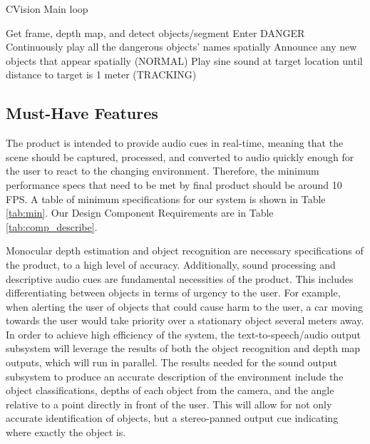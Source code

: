 \documentclass[12pt,a4paper]{article}
\begin{document}
  \begin{algorithm}
    \caption{CVision Main loop}
    \label{alg:grandloop}  %
    \begin{algorithmic}[1]
            \State Get frame, depth map, and detect objects/segment
                \State Enter DANGER
            \EndIf
                \State Continuously play all the dangerous objects' names spatially
            \Else
                \State Announce any new objects that appear spatially (NORMAL)
            \EndIf
                \State Play sine sound at target location until distance to target is 1 meter (TRACKING)
            \EndIf
        \EndWhile
        \end{algorithmic}
        \end{algorithm}



        
        \subsection{Must-Have Features}
        The product is intended to provide audio cues in real-time, meaning that the scene should be captured, processed, and converted to audio quickly enough for the user to react to the changing environment.
        Therefore, the minimum performance specs that need to be met by final product should be around 10 FPS.
        A table of minimum specifications for our system is shown in Table \ref{tab:min}. Our Design Component Requirements are in Table \ref{tab:comp_describe}.

        Monocular depth estimation and object recognition are necessary specifications of the product, to a high level of accuracy. Additionally, sound processing and descriptive audio cues are fundamental necessities of the product. This includes differentiating between objects in terms of urgency to the user. For example, when alerting the user of objects that could cause harm to the user, a car moving towards the user would take priority over a stationary object several meters away. 
        In order to achieve high efficiency of the system, the text-to-speech/audio output subsystem will leverage the results of both the object recognition and depth map outputs, which will run in parallel. The results needed for the sound output subsystem to produce an accurate description of the environment include the object classifications, depths of each object from the camera, and the angle relative to a point directly in front of the user. This will allow for not only accurate identification of objects, but a stereo-panned output cue indicating where exactly the object is. 
\end{document}
